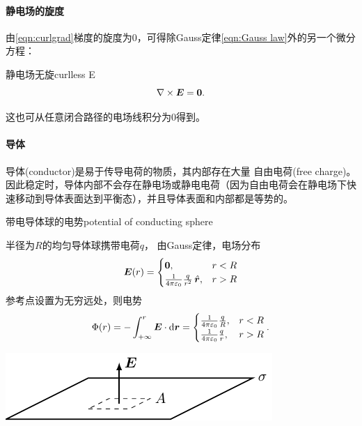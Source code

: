 \paragraph{静电场的旋度}

由\eqref{eqn:curlgrad}梯度的旋度为0，可得除Gauss定律\eqref{eqn:Gauss law}外的另一个微分方程：
\begin{theorem}{静电场无旋}{curlless E}
    \begin{equation}
        \label{eqn:curlE}
        \nabla\times\bm E=\bm 0.
    \end{equation}
\end{theorem}
这也可从任意闭合路径的电场线积分为0得到。

\paragraph{导体}
导体(conductor)是易于传导电荷的物质，其内部存在大量%
自由电荷(free charge)。因此稳定时，导体内部不会存在静电场或静电电荷（因为自由电荷会在静电场下快速移动到导体表面达到平衡态），并且导体表面和内部都是等势的。
\begin{example}{带电导体球的电势}{potential of conducting sphere}

    半径为$R$的均匀导体球携带电荷$q$，%
    由Gauss定律，电场分布
    \[
        \bm E(r)=
        \begin{cases}
            \bm 0,&r<R\\
            \frac1{4\pi\varepsilon_0}\frac q{r^2}\mathop{}\!\hat{\bm{r}},&r>R
        \end{cases}
    \]
    参考点设置为无穷远处，则电势
    \[
        \Phi(r)=-\int_{+\infty}^r\bm E\cdot\mathop{}\!\mathrm{d}\bm r=
        \begin{cases}
            \frac1{4\pi\varepsilon_0}\frac qR,&r<R\\
            \frac1{4\pi\varepsilon_0}\frac qr,&r>R
        \end{cases}.
    \]
    \begin{center}
        \includegraphics[page=4]{figures/tikz/layouts.pdf}
        \label{fig:conducting sphere}
    \end{center}
\end{example}


